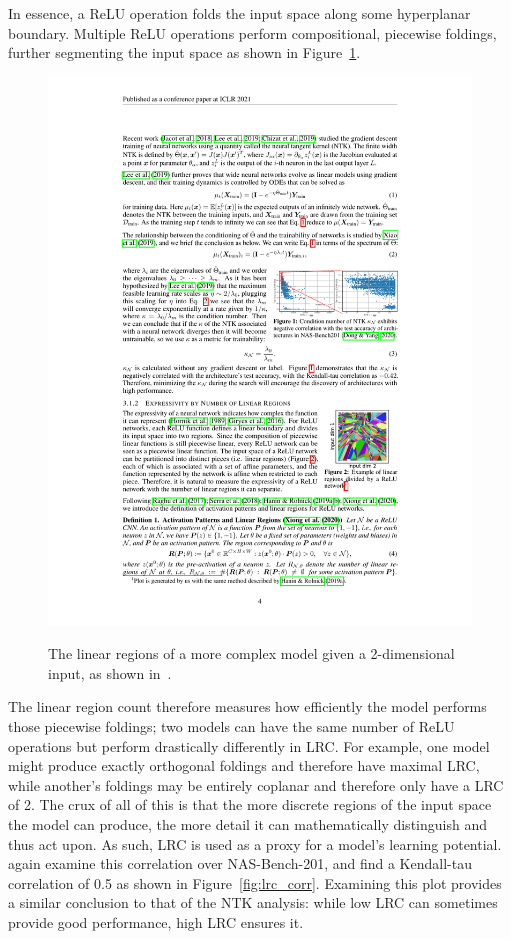 In essence, a ReLU operation folds the input space along some hyperplanar boundary. Multiple ReLU operations perform
compositional, piecewise foldings, further segmenting the input space as shown in Figure~\ref{fig:lrc_complex}.
\begin{figure}[ht]
    \centering
	\includegraphics[width=.4\textwidth]{linearregions} \\
	\caption[The linear regions of a more complex model]{The linear regions of a more complex model given a 2-dimensional input, as shown in~\cite{chen2021}.}
    \label{fig:lrc_complex}
\end{figure}

The linear region count therefore measures how efficiently the model performs those piecewise foldings; two models
can have the same number of ReLU operations but perform drastically differently in LRC. For example, one model might
produce exactly orthogonal foldings and therefore have maximal LRC, while another's foldings may be entirely coplanar
and therefore only have a LRC of 2. The crux of all of this is that the more discrete regions of the input space the model
can produce, the more detail it can mathematically distinguish and thus act upon. As such, LRC is used as a proxy
for a model's learning potential. \citeauthor{chen2021} again examine this correlation over NAS-Bench-201, and find a
Kendall-tau correlation of 0.5 as shown in Figure~\ref{fig:lrc_corr}. Examining this plot provides a similar conclusion to that of the NTK analysis: while low LRC can sometimes provide good
performance, high LRC ensures it.

